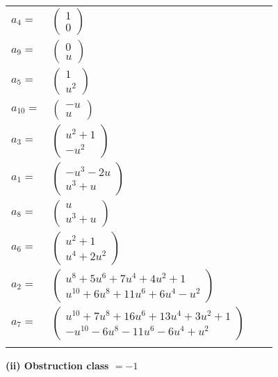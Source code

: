 \documentclass[1p]{elsarticle_modified}
\theoremstyle{definition}
\begin{document}
\begin{tabular}{m{7pt} m{180pt} m{7pt} m{180pt} }
\flushright $a_{4}=$&$\begin{pmatrix}1\\0\end{pmatrix}$ \\
\flushright $a_{9}=$&$\begin{pmatrix}0\\u\end{pmatrix}$ \\
\flushright $a_{5}=$&$\begin{pmatrix}1\\u^2\end{pmatrix}$ \\
\flushright $a_{10}=$&$\begin{pmatrix}- u\\u\end{pmatrix}$ \\
\flushright $a_{3}=$&$\begin{pmatrix}u^2+1\\- u^2\end{pmatrix}$ \\
\flushright $a_{1}=$&$\begin{pmatrix}- u^3-2 u\\u^3+u\end{pmatrix}$ \\
\flushright $a_{8}=$&$\begin{pmatrix}u\\u^3+u\end{pmatrix}$ \\
\flushright $a_{6}=$&$\begin{pmatrix}u^2+1\\u^4+2 u^2\end{pmatrix}$ \\
\flushright $a_{2}=$&$\begin{pmatrix}u^8+5 u^6+7 u^4+4 u^2+1\\u^{10}+6 u^8+11 u^6+6 u^4- u^2\end{pmatrix}$ \\
\flushright $a_{7}=$&$\begin{pmatrix}u^{10}+7 u^8+16 u^6+13 u^4+3 u^2+1\\- u^{10}-6 u^8-11 u^6-6 u^4+u^2\end{pmatrix}$\\&\end{tabular}
\flushleft \textbf{(ii) Obstruction class $= -1$}\\~\\
\end{document}
